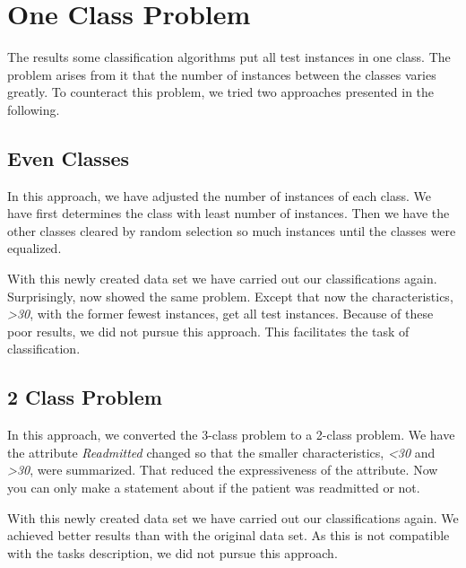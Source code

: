 \section{One Class Problem}
\label{ocp}

The results some classification algorithms put all test instances in one class. The problem arises from it that the number of instances between the classes varies greatly. To counteract this problem, we tried two approaches presented in the following.

\subsection{Even Classes}
\label{even}
In this approach, we have adjusted the number of instances of each class. We have first determines the class with least number of instances. Then we have the other classes cleared by random selection so much instances until the classes were equalized.

With this newly created data set we have carried out our classifications again.
Surprisingly, now showed the same problem. Except that now the characteristics, \textit{ \textgreater 30}, with the former fewest instances, get all test instances.
Because of these poor results, we did not pursue this approach. This facilitates the task of classification.




\subsection{2 Class Problem}
\label{2class}

In this approach, we converted the 3-class problem to a 2-class problem.
We have the attribute \textit{Readmitted} changed so that
the smaller characteristics, \textit{ \textless 30} and \textit{ \textgreater 30}, were summarized.
That reduced the expressiveness of the attribute. Now you can only make a statement about if the patient was readmitted or not.

With this newly created data set we have carried out our classifications again. We achieved better results than with the original data set. As this is not compatible with the tasks description, we did not pursue this approach.

